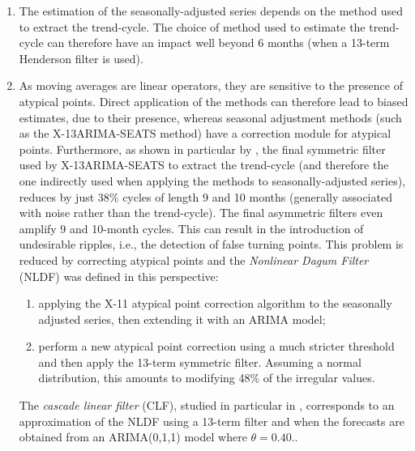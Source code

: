 \documentclass[
]{article}
\newcommand\1{\mathds{1}}
\begin{document}
\begin{enumerate}
\def\labelenumi{\arabic{enumi}.}
\item
  The estimation of the seasonally-adjusted series depends on the method
  used to extract the trend-cycle. The choice of method used to estimate
  the trend-cycle can therefore have an impact well beyond 6 months
  (when a 13-term Henderson filter is used).
\item
  As moving averages are linear operators, they are sensitive to the
  presence of atypical points. Direct application of the methods can
  therefore lead to biased estimates, due to their presence, whereas
  seasonal adjustment methods (such as the X-13ARIMA-SEATS method) have
  a correction module for atypical points. Furthermore, as shown in
  particular by \textcite{dagum1996new}, the final symmetric filter used
  by X-13ARIMA-SEATS to extract the trend-cycle (and therefore the one
  indirectly used when applying the methods to seasonally-adjusted
  series), reduces by just 38\% cycles of length 9 and 10 months
  (generally associated with noise rather than the trend-cycle). The
  final asymmetric filters even amplify 9 and 10-month cycles. This can
  result in the introduction of undesirable ripples, i.e., the detection
  of false turning points. This problem is reduced by correcting
  atypical points and the \emph{Nonlinear Dagum Filter} (NLDF) was
  defined in this perspective:

  \begin{enumerate}
  \def\labelenumii{\alph{enumii}.}
  \item
    applying the X-11 atypical point correction algorithm \autocite[see
    for example][ for a description]{ladiray2011seasonal} to the
    seasonally adjusted series, then extending it with an ARIMA model;
  \item
    perform a new atypical point correction using a much stricter
    threshold and then apply the 13-term symmetric filter. Assuming a
    normal distribution, this amounts to modifying 48\% of the irregular
    values.
  \end{enumerate}

  The \emph{cascade linear filter} (CLF), studied in particular in
  \textcite{dagumBianconcini2023}, corresponds to an approximation of
  the NLDF using a 13-term filter and when the forecasts are obtained
  from an ARIMA(0,1,1) model where \(\theta=0.40.\).
\end{enumerate}
\end{document}
